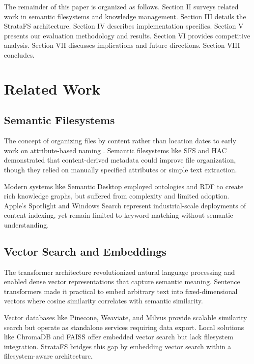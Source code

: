\documentclass[conference]{IEEEtran}
\begin{document}
The remainder of this paper is organized as follows. Section II surveys related work in semantic filesystems and knowledge management. Section III details the StrataFS architecture. Section IV describes implementation specifics. Section V presents our evaluation methodology and results. Section VI provides competitive analysis. Section VII discusses implications and future directions. Section VIII concludes.

\section{Related Work}

\subsection{Semantic Filesystems}

The concept of organizing files by content rather than location dates to early work on attribute-based naming \cite{gifford1991semantic}. Semantic filesystems like SFS \cite{gopal1999sfs} and HAC \cite{soules2003metadata} demonstrated that content-derived metadata could improve file organization, though they relied on manually specified attributes or simple text extraction.

Modern systems like Semantic Desktop \cite{sauermann2006semantic} employed ontologies and RDF to create rich knowledge graphs, but suffered from complexity and limited adoption. Apple's Spotlight and Windows Search represent industrial-scale deployments of content indexing, yet remain limited to keyword matching without semantic understanding.

\subsection{Vector Search and Embeddings}

The transformer architecture \cite{vaswani2017attention} revolutionized natural language processing and enabled dense vector representations that capture semantic meaning. Sentence transformers \cite{reimers2019sentence} made it practical to embed arbitrary text into fixed-dimensional vectors where cosine similarity correlates with semantic similarity.

Vector databases like Pinecone, Weaviate, and Milvus provide scalable similarity search but operate as standalone services requiring data export. Local solutions like ChromaDB and FAISS offer embedded vector search but lack filesystem integration. StrataFS bridges this gap by embedding vector search within a filesystem-aware architecture.
\end{document}
